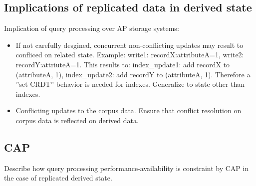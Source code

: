 \subsection{Implications of replicated data in derived state}
Implication of query processing over AP storage systems:
\begin{itemize}
  \item If not carefully desgined, concurrent non-conflicting updates may
  result to confliced on related state.
  Example: write1: recordX:attributeA=1, write2: recordY:attriuteA=1.
  This results to: index\_update1: add recordX to (attributeA, 1),
  index\_update2: add recordY to (attributeA, 1).
  Therefore a ''set CRDT'' behavior is needed for indexes.
  Generalize to state other than indexes.
  \item Conflicting updates to the corpus data.
  Ensure that conflict resolution on corpus data is reflected on derived data.
\end{itemize}

\subsection{CAP}
Describe how query processing performance-availability is constraint by
CAP in the case of replicated derived state.